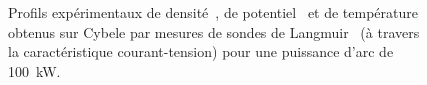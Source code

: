 \begin{refsection}
\begin{figure}[!htbp]
  \centering
    \caption{Profils expérimentaux de densité~, de
    potentiel~ et de
    température~ obtenus sur Cybele par
    mesures de sondes de Langmuir~\parencite{SimoninHDR} (à travers la
    caractéristique courant-tension) pour une puissance d'arc de 100~kW.}
    \label{4-CybeleExp}
\end{figure}
\begin{figure}[!htbp]
  \centering

\end{figure}
\end{refsection}
